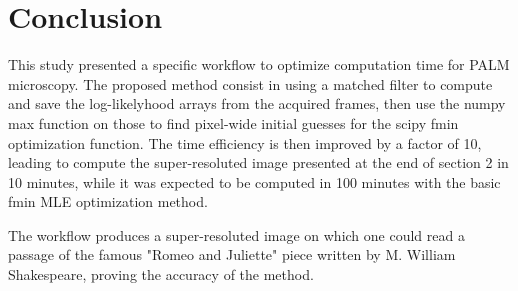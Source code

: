 \documentclass[10pt,letterpaper]{article}
\begin{document}
\section{Conclusion}
This study presented a specific workflow to optimize computation time for PALM microscopy. The proposed method consist in using a matched filter to compute and save the log-likelyhood arrays from the acquired frames, then use the numpy max function on those to find pixel-wide initial guesses for the scipy fmin optimization function. The time efficiency is then improved by a factor of 10, leading to compute the super-resoluted image presented at the end of section 2 in 10 minutes, while it was expected to be computed in 100 minutes with the basic fmin MLE optimization method.

The workflow produces a super-resoluted image on which one could read a passage of the famous "Romeo and Juliette" piece written by M. William Shakespeare, proving the accuracy of the method.
\end{document}
